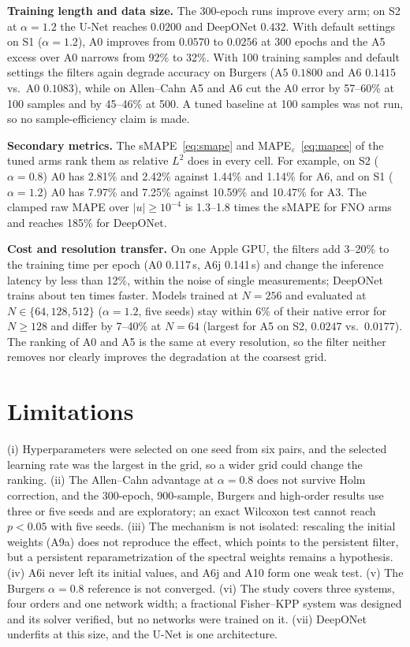 \documentclass[conference]{IEEEtran}
\begin{document}
\textbf{Training length and data size.} The 300-epoch runs improve every arm; on S2 at $\alpha=1.2$ the U-Net reaches $0.0200$ and DeepONet $0.432$. With default settings on S1 ($\alpha=1.2$), A0 improves from $0.0570$ to $0.0256$ at 300 epochs and the A5 excess over A0 narrows from 92\% to 32\%. With 100 training samples and default settings the filters again degrade accuracy on Burgers (A5 $0.1800$ and A6 $0.1415$ vs.\ A0 $0.1083$), while on Allen--Cahn A5 and A6 cut the A0 error by 57--60\% at 100 samples and by 45--46\% at 500. A tuned baseline at 100 samples was not run, so no sample-efficiency claim is made.

\textbf{Secondary metrics.} The sMAPE~\eqref{eq:smape} and MAPE$_\varepsilon$~\eqref{eq:mapee} of the tuned arms rank them as relative $L^2$ does in every cell. For example, on S2 ($\alpha=0.8$) A0 has 2.81\% and 2.42\% against 1.44\% and 1.14\% for A6, and on S1 ($\alpha=1.2$) A0 has 7.97\% and 7.25\% against 10.59\% and 10.47\% for A3. The clamped raw MAPE over $|u|\ge10^{-4}$ is 1.3--1.8 times the sMAPE for FNO arms and reaches 185\% for DeepONet.

\textbf{Cost and resolution transfer.} On one Apple GPU, the filters add 3--20\% to the training time per epoch (A0 0.117\,s, A6j 0.141\,s) and change the inference latency by less than 12\%, within the noise of single measurements; DeepONet trains about ten times faster. Models trained at $N=256$ and evaluated at $N\in\{64,128,512\}$ ($\alpha=1.2$, five seeds) stay within 6\% of their native error for $N\ge128$ and differ by 7--40\% at $N=64$ (largest for A5 on S2, $0.0247$ vs.\ $0.0177$). The ranking of A0 and A5 is the same at every resolution, so the filter neither removes nor clearly improves the degradation at the coarsest grid.

\section{Limitations}
(i) Hyperparameters were selected on one seed from six pairs, and the selected learning rate was the largest in the grid, so a wider grid could change the ranking. (ii) The Allen--Cahn advantage at $\alpha=0.8$ does not survive Holm correction, and the 300-epoch, 900-sample, Burgers and high-order results use three or five seeds and are exploratory; an exact Wilcoxon test cannot reach $p<0.05$ with five seeds. (iii) The mechanism is not isolated: rescaling the initial weights (A9a) does not reproduce the effect, which points to the persistent filter, but a persistent reparametrization of the spectral weights remains a hypothesis. (iv) A6i never left its initial values, and A6j and A10 form one weak test. (v) The Burgers $\alpha=0.8$ reference is not converged. (vi) The study covers three systems, four orders and one network width; a fractional Fisher--KPP system was designed and its solver verified, but no networks were trained on it. (vii) DeepONet underfits at this size, and the U-Net is one architecture.
\end{document}
